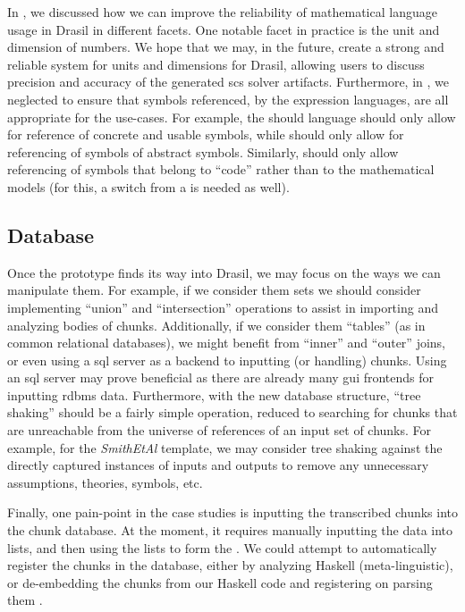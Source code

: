 In , we discussed how we can improve the
reliability of mathematical language usage in Drasil in different facets. One
notable facet in practice is the unit and dimension of numbers. We hope that we
may, in the future, create a strong and reliable system for units and dimensions
for Drasil, allowing users to discuss precision and accuracy of the generated
\acs{scs} solver artifacts. Furthermore, in , we neglected
to ensure that symbols referenced, by the expression languages, are all
appropriate for the use-cases. For example, the \Expr{} should language should
only allow for reference of concrete and usable symbols, while \ModelExpr{}
should only allow for referencing of symbols of abstract symbols. Similarly,
\CodeExpr{} should only allow referencing of symbols that belong to ``code''
rather than to the mathematical models (for this, a switch from a
\QuantityDict{} is needed as well).

\subsection{Database}

Once the \ChunkDB{} prototype finds its way into Drasil, we may focus on the
ways we can manipulate them. For example, if we consider them sets we should
consider implementing ``union'' and ``intersection'' operations to assist in
importing and analyzing bodies of chunks. Additionally, if we consider them
``tables'' (as in common relational databases), we might benefit from ``inner''
and ``outer'' joins, or even using a \acs{sql} server as a backend to inputting
(or handling) chunks. Using an \acs{sql} server may prove beneficial as there
are already many \acs{gui} frontends for inputting \acs{rdbms} data.
Furthermore, with the new database structure, ``tree shaking'' should be a
fairly simple operation, reduced to searching for chunks that are unreachable
from the universe of references of an input set of chunks. For example, for the
\textit{SmithEtAl} template, we may consider tree shaking against the directly
captured instances of inputs and outputs to remove any unnecessary assumptions,
theories, symbols, etc.

Finally, one pain-point in the case studies is inputting the transcribed chunks
into the chunk database. At the moment, it requires manually inputting the data
into lists, and then using the lists to form the \ChunkDB{}. We could attempt to automatically register the
chunks in the database, either by analyzing Haskell (meta-linguistic), or
de-embedding the chunks from our Haskell code and registering on parsing them
\cite{DrasilIssue2873ChunkDBCaretteResponse}. 

